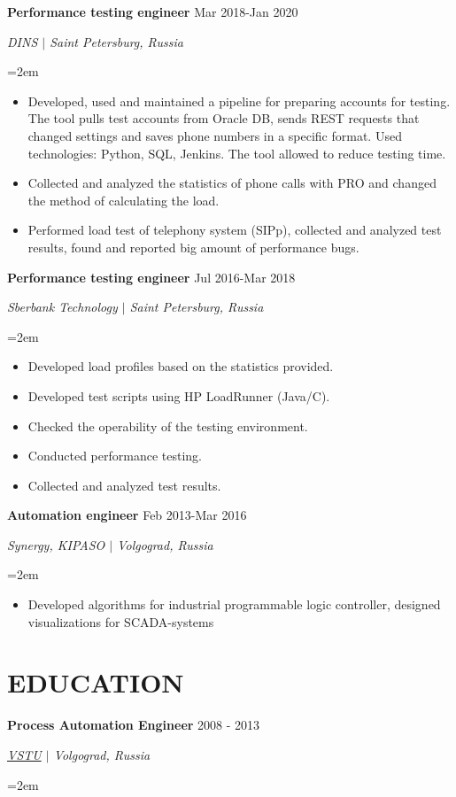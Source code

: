 \documentclass{article}
\newcommand{\NewPart}[1]{\section*{{\color{gray}\uppercase{#1}}}}
\newcommand{\ExperienceEntry}[4]{
		\noindent \textbf{#1} \hfill  
		\hfill #2 \par  %
		\noindent \textit{#3} \par        %
		\noindent\hangindent=2em\hangafter=0 \small #4 %
		\normalsize \par}
\begin{document}
\ExperienceEntry
{Performance testing engineer}
{Mar 2018-Jan 2020}
{DINS $\vert$ Saint Petersburg, Russia}
{	
\begin{itemize}
	\item{Developed, used and maintained a pipeline for preparing accounts for testing. The tool pulls test accounts from Oracle DB, sends REST requests that changed settings and saves phone numbers in a specific format. Used technologies: Python, SQL, Jenkins. The tool allowed to reduce testing time.}
	\item{Collected and analyzed the statistics of phone calls with PRO and changed the method of calculating the load.}
	\item{Performed load test of telephony system (SIPp), collected and analyzed test results, found and reported big amount of performance bugs.}
\end{itemize}
}

\ExperienceEntry
{Performance testing engineer}
{Jul 2016-Mar 2018}
{Sberbank Technology $\vert$ Saint Petersburg, Russia}
{	
\begin{itemize}
	\item{Developed load profiles based on the statistics provided.}
	\item{Developed test scripts using HP LoadRunner (Java/C).}
	\item{Checked the operability of the testing environment.}
	\item{Conducted performance testing.}
	\item{Collected and analyzed test results.}
\end{itemize}
}

\ExperienceEntry
{Automation engineer}
{Feb 2013-Mar 2016}
{Synergy, KIPASO $\vert$ Volgograd, Russia}
{	
\begin{itemize}
	\item{Developed algorithms for industrial programmable logic controller, designed visualizations for SCADA-systems}
\end{itemize}
}


\NewPart{Education}{}

\ExperienceEntry
{Process Automation Engineer}
{2008 - 2013}
{\href{http://vstu.ru}
{VSTU} $\vert$ Volgograd, Russia}
{}
\end{document}
